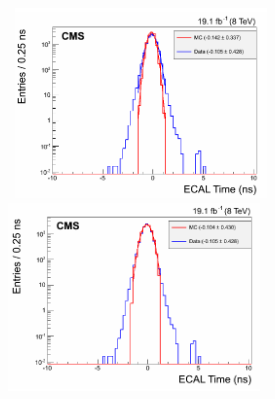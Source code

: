 \vspace{5mm}
\begin{minipage}{0.90\linewidth} 
\begin{center}
\centering
\mbox{
\includegraphics[height=0.62\textwidth, width=0.5\textwidth]{THESISPLOTS/MC_Vs_DataTimeB4Calib.png}
\includegraphics[height=0.6\textwidth, width=0.5\textwidth]{THESISPLOTS/MC_Vs_DataTimeAferCalib.png}
}
\label{fig:DATAMCTime}
\end{center}
\end{minipage} 
